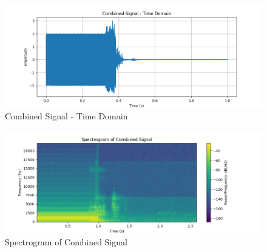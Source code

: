 \documentclass[letterpaper, 12pt]{article}
\begin{document}
\begin{figure}
    \centering
     \caption{Combined Signal - Time Domain}
    \includegraphics[width=0.75\linewidth]{FINAL_ASSIGNMENT/Combined Signal - Time Domain.png}
   
    
\end{figure}

\begin{figure}
    \centering
        \caption{Spectrogram of Combined Signal}
    \includegraphics[width=0.75\linewidth]{FINAL_ASSIGNMENT/Spectrogram of Combined Signal.png}
    
\end{figure}
\end{document}
